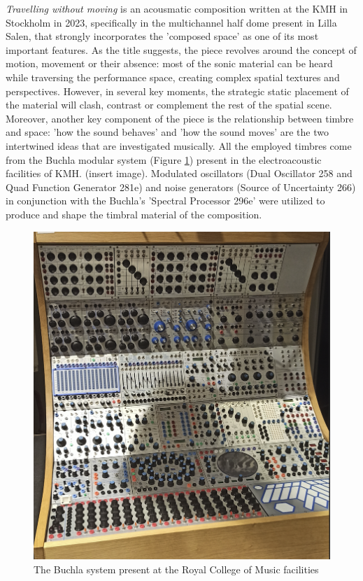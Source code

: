 \documentclass{article}
\begin{document}
        \textit{Travelling without moving} is an acousmatic composition written at the KMH in Stockholm in 2023, specifically in the multichannel half dome present in Lilla Salen, that strongly incorporates the 'composed space' as one of its most important features. As the title suggests, the piece revolves around the concept of motion, movement or their absence: most of the sonic material can be heard while traversing the performance space, creating complex spatial textures and perspectives. However, in several key moments, the strategic static placement of the material will clash, contrast or complement the rest of the spatial scene. Moreover, another key component of the piece is the relationship between timbre and space: 'how the sound behaves' and 'how the sound moves' are the two intertwined ideas that are investigated musically. All the employed timbres come from the Buchla modular system (Figure \ref{fig:buchla}) present in the electroacoustic facilities of KMH. (insert image). Modulated oscillators (Dual Oscillator 258 and Quad Function Generator 281e) and noise generators (Source of Uncertainty 266) in conjunction with the Buchla's 'Spectral Processor 296e' were utilized to produce and shape the timbral material of the composition.   

        \begin{figure}[h]
		\centering
		\includegraphics[width=1\columnwidth]{SMC_2024_Paper/buchla.png}
		\caption{The Buchla system present at the Royal College of Music facilities\label{fig:buchla}}
	\end{figure} 
        
\end{document}
